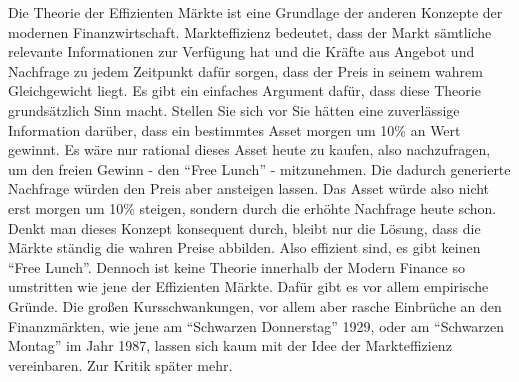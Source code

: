 Die Theorie der Effizienten Märkte ist eine Grundlage der anderen Konzepte der modernen Finanzwirtschaft. Markteffizienz bedeutet, dass der Markt sämtliche relevante Informationen zur Verfügung hat und die Kräfte aus Angebot und Nachfrage zu jedem Zeitpunkt dafür sorgen, dass der Preis in seinem wahrem Gleichgewicht liegt. Es gibt ein einfaches Argument dafür, dass diese Theorie grundsätzlich Sinn macht. Stellen Sie sich vor Sie hätten eine zuverlässige Information darüber, dass ein bestimmtes Asset morgen um 10\% an Wert gewinnt. Es wäre nur rational dieses Asset heute zu kaufen, also nachzufragen, um den freien Gewinn - den "`Free Lunch"' - mitzunehmen. Die dadurch generierte Nachfrage würden den Preis aber ansteigen lassen. Das Asset würde also nicht erst morgen um 10\% steigen, sondern durch die erhöhte Nachfrage heute schon. Denkt man dieses Konzept konsequent durch, bleibt nur die Lösung, dass die Märkte ständig die wahren Preise abbilden. Also effizient sind, es gibt keinen "`Free Lunch"'. Dennoch ist keine Theorie innerhalb der Modern Finance so umstritten wie jene der Effizienten Märkte. Dafür gibt es vor allem empirische Gründe. Die großen Kursschwankungen, vor allem aber rasche Einbrüche an den Finanzmärkten, wie jene am "`Schwarzen Donnerstag"' 1929, oder am "`Schwarzen Montag"' im Jahr 1987, lassen sich kaum mit der Idee der Markteffizienz vereinbaren. Zur Kritik später mehr.

